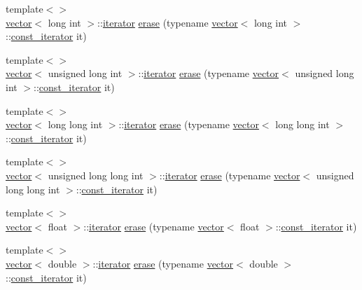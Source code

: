 \begin{DoxyCompactItemize}
\item 
{\footnotesize template$<$$>$ }\\\mbox{\hyperlink{classvector}{vector}}$<$ long int $>$\+::\mbox{\hyperlink{classvector_a35c955cacac6aacaa1e82874b1628865}{iterator}} \mbox{\hyperlink{classvector_a9ce1edb3994fea8a0679228da3b03e37}{erase}} (typename \mbox{\hyperlink{classvector}{vector}}$<$ long int $>$\+::\mbox{\hyperlink{classvector_a2fc97dce62b7053449cc868607540dba}{const\+\_\+iterator}} it)
\item 
{\footnotesize template$<$$>$ }\\\mbox{\hyperlink{classvector}{vector}}$<$ unsigned long int $>$\+::\mbox{\hyperlink{classvector_a35c955cacac6aacaa1e82874b1628865}{iterator}} \mbox{\hyperlink{classvector_a07d1a32387ef4a6e29dda38d879354eb}{erase}} (typename \mbox{\hyperlink{classvector}{vector}}$<$ unsigned long int $>$\+::\mbox{\hyperlink{classvector_a2fc97dce62b7053449cc868607540dba}{const\+\_\+iterator}} it)
\item 
{\footnotesize template$<$$>$ }\\\mbox{\hyperlink{classvector}{vector}}$<$ long long int $>$\+::\mbox{\hyperlink{classvector_a35c955cacac6aacaa1e82874b1628865}{iterator}} \mbox{\hyperlink{classvector_a20e68bb7349c1076f3cd6d6a8310ac0a}{erase}} (typename \mbox{\hyperlink{classvector}{vector}}$<$ long long int $>$\+::\mbox{\hyperlink{classvector_a2fc97dce62b7053449cc868607540dba}{const\+\_\+iterator}} it)
\item 
{\footnotesize template$<$$>$ }\\\mbox{\hyperlink{classvector}{vector}}$<$ unsigned long long int $>$\+::\mbox{\hyperlink{classvector_a35c955cacac6aacaa1e82874b1628865}{iterator}} \mbox{\hyperlink{classvector_a5b5a501da74cb2390dfef3500d0f690e}{erase}} (typename \mbox{\hyperlink{classvector}{vector}}$<$ unsigned long long int $>$\+::\mbox{\hyperlink{classvector_a2fc97dce62b7053449cc868607540dba}{const\+\_\+iterator}} it)
\item 
{\footnotesize template$<$$>$ }\\\mbox{\hyperlink{classvector}{vector}}$<$ float $>$\+::\mbox{\hyperlink{classvector_a35c955cacac6aacaa1e82874b1628865}{iterator}} \mbox{\hyperlink{classvector_ab265d1545de5cbda30a5cfd2f125af2c}{erase}} (typename \mbox{\hyperlink{classvector}{vector}}$<$ float $>$\+::\mbox{\hyperlink{classvector_a2fc97dce62b7053449cc868607540dba}{const\+\_\+iterator}} it)
\item 
{\footnotesize template$<$$>$ }\\\mbox{\hyperlink{classvector}{vector}}$<$ double $>$\+::\mbox{\hyperlink{classvector_a35c955cacac6aacaa1e82874b1628865}{iterator}} \mbox{\hyperlink{classvector_a35a784da0a4e1fe655e7f012d5e71f99}{erase}} (typename \mbox{\hyperlink{classvector}{vector}}$<$ double $>$\+::\mbox{\hyperlink{classvector_a2fc97dce62b7053449cc868607540dba}{const\+\_\+iterator}} it)

\end{DoxyCompactItemize}
